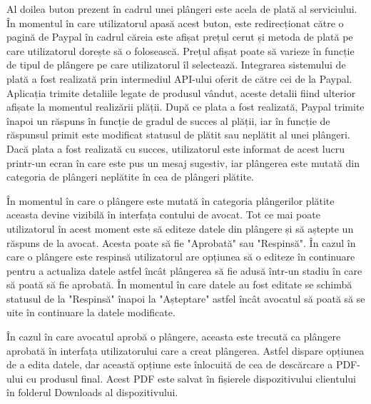 \documentclass[12pt,a4paper]{report}
\theoremstyle{definition}
\theoremstyle{remark}
\begin{document}
Al doilea buton prezent în cadrul unei plângeri este acela de plată al serviciului. În momentul în care utilizatorul apasă acest buton, este redirecționat către o pagină de Paypal în cadrul căreia este afișat prețul cerut și metoda de plată pe care utilizatorul dorește să o folosească. Prețul afișat poate să varieze în funcție de tipul de plângere pe care utilizatorul îl selectează. Integrarea sistemului de plată a fost realizată prin intermediul API-ului oferit de către cei de la Paypal. Aplicația trimite detaliile legate de produsul vândut, aceste detalii fiind ulterior afișate la momentul realizării plății. După ce plata a fost realizată, Paypal trimite înapoi un răspuns în funcție de gradul de succes al plății, iar în funcție de răspunsul primit este modificat statusul de plătit sau neplătit al unei plângeri. Dacă plata a fost realizată cu succes, utilizatorul este informat de acest lucru printr-un ecran în care este pus un mesaj sugestiv, iar plângerea este mutată din categoria de plângeri neplătite în cea de plângeri plătite. 

În momentul în care o plângere este mutată în categoria plângerilor plătite aceasta devine vizibilă în interfața contului de avocat. Tot ce mai poate utilizatorul în acest moment este să editeze datele din plângere și să aștepte un răspuns de la avocat. Acesta poate să fie "Aprobată" sau "Respinsă". În cazul în care o plângere este respinsă utilizatorul are opțiunea să o editeze în continuare pentru a actualiza datele astfel încât plângerea să fie adusă într-un stadiu în care să poată să fie aprobată. În momentul în care datele au fost editate se schimbă statusul de la "Respinsă" înapoi la "Așteptare" astfel încât avocatul să poată să se uite în continuare la datele modificate. 

În cazul în care avocatul aprobă o plângere, aceasta este trecută ca plângere aprobată în interfața utilizatorului care a creat plângerea. Astfel dispare opțiunea de a edita datele, dar această opțiune este înlocuită de cea de descărcare a PDF-ului cu produsul final. Acest PDF este salvat în fișierele dispozitivului clientului în folderul Downloads al dispozitivului. 
\end{document}
